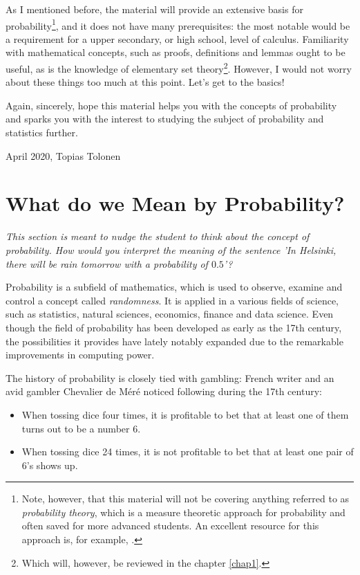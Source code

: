 \documentclass[12pt,a4paper,leqno]{report}
\theoremstyle{plain}
\theoremstyle{definition}
\begin{document}
As I mentioned before, the material will provide an extensive basis for probability\footnote{Note, however, that this material will not be covering anything referred to as \emph{probability theory}, which is a measure theoretic approach for probability and often saved for more advanced students. An excellent resource for this approach is, for example, \textcite{durrett}.}, and it does not have many prerequisites: the most notable would be a requirement for a upper secondary, or high school, level of calculus. Familiarity with mathematical concepts, such as proofs, definitions and lemmas ought to be useful, as is the knowledge of elementary set theory\footnote{Which will, however, be reviewed in the chapter \ref{chap1}.}. However, I would not worry about these things too much at this point. Let's get to the basics! 

Again, sincerely, hope this material helps you with the concepts of probability and sparks you with the interest to studying the subject of probability and statistics further.\linebreak

April 2020, Topias Tolonen

\section{What do we Mean by Probability?}

\emph{This section is meant to nudge the student to think about the concept of probability. How would you interpret the meaning of the sentence 'In Helsinki, there will be rain tomorrow with a probability of $0.5$'?}

Probability is a subfield of mathematics, which is used to observe, examine and control a concept called \emph{randomness}. It is applied in a various fields of science, such as statistics, natural sciences, economics, finance and data science. Even though the field of probability has been developed as early as the 17th century, the possibilities it provides have lately notably expanded due to the remarkable improvements in computing power.

The history of probability is closely tied with gambling: French writer and an avid gambler Chevalier de Méré noticed following during the 17th century: 

\begin{itemize}
    \item When tossing dice four times, it is profitable to bet that at least one of them turns out to be a number $6$.
    \item When tossing dice 24 times, it is not profitable to bet that at least one pair of $6$'s shows up.
\end{itemize}
\end{document}
